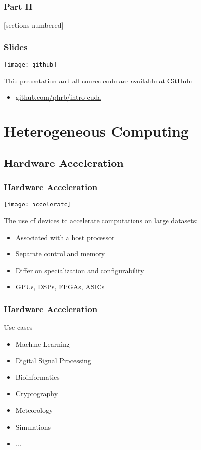\documentclass[10pt, compress]{beamer}
\begin{document}
\begin{frame}
    \frametitle{Part II}
    [sections numbered]
    \tableofcontents[hideallsubsections, part=2]
\end{frame}

\begin{frame}
    \frametitle{Slides}
    \begin{center}
        \texttt{[image: github]}
    \end{center}
    This presentation and all source code are available
    at \alert{GitHub}:

    \begin{itemize}
        \item \url{github.com/phrb/intro-cuda}
    \end{itemize}
\end{frame}

\section{Heterogeneous Computing}

\subsection{Hardware Acceleration}

\begin{frame}
    \frametitle{Hardware Acceleration}
    \begin{center}
        \texttt{[image: accelerate]}
    \end{center}

    The use of \alert{devices} to accelerate computations on large datasets:
    \pause
    \begin{itemize}
        \item Associated with a \alert{host} processor
            \pause
        \item Separate \alert{control} and \alert{memory}
            \pause
        \item Differ on \alert{specialization} and \alert{configurability}
            \pause
        \item \alert{GPUs}, DSPs, FPGAs, ASICs
    \end{itemize}
\end{frame}

\begin{frame}
    \frametitle{Hardware Acceleration}
    Use cases:
    \begin{itemize}
        \item Machine Learning
        \item Digital Signal Processing
        \item Bioinformatics
        \item Cryptography
        \item Meteorology
        \item Simulations
        \item ...
    \end{itemize}
\end{frame}
\end{document}
